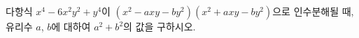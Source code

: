 다항식 $x^4-6x^2y^2+y^4$이 $(x^2-axy-by^2)(x^2+axy-by^2)$으로 인수분해될 때, 유리수 $a$, $b$에 대하여 $a^2+b^2$의 값을 구하시오.
